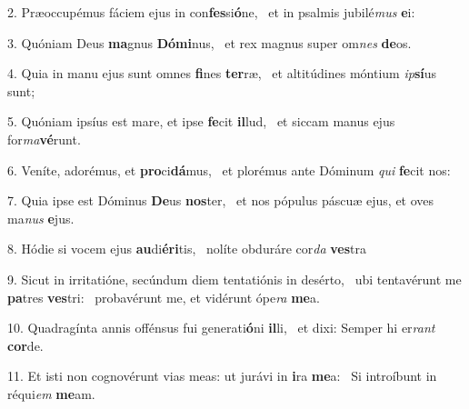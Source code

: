 2. Præoccupémus fáciem ejus in con\textbf{fes}si\textbf{ó}ne, \ast\  et in psalmis jubilé\textit{mus} \textbf{e}i:\

3. Quóniam Deus \textbf{ma}gnus \textbf{Dó}\textbf{mi}nus, \ast\  et rex magnus super om\textit{nes} \textbf{de}os.\

4. Quia in manu ejus sunt omnes \textbf{fi}nes \textbf{ter}ræ, \ast\  et altitúdines móntium \textit{ip}\textbf{sí}us sunt;\

5. Quóniam ipsíus est mare, et ipse \textbf{fe}cit \textbf{il}lud, \ast\  et siccam manus ejus for\textit{ma}\textbf{vé}runt.\

6. Veníte, adorémus, et \textbf{pro}ci\textbf{dá}mus, \ast\  et plorémus ante Dóminum \textit{qui} \textbf{fe}cit nos:\

7. Quia ipse est Dóminus \textbf{De}us \textbf{nos}ter, \ast\  et nos pópulus páscuæ ejus, et oves ma\textit{nus} \textbf{e}jus.\

8. Hódie si vocem ejus \textbf{au}di\textbf{é}\textbf{ri}tis, \ast\  nolíte obduráre cor\textit{da} \textbf{ves}tra\

9. Sicut in irritatióne, secúndum diem tentatiónis in desérto, \dag\  ubi tentavérunt me \textbf{pa}tres \textbf{ves}tri: \ast\  probavérunt me, et vidérunt ópe\textit{ra} \textbf{me}a.\

10. Quadragínta annis offénsus fui generati\textbf{ó}ni \textbf{il}li, \ast\  et dixi: Semper hi er\textit{rant} \textbf{cor}de.\

11. Et isti non cognovérunt vias meas: ut jurávi in \textbf{i}ra \textbf{me}a: \ast\  Si introíbunt in réqui\textit{em} \textbf{me}am.\

